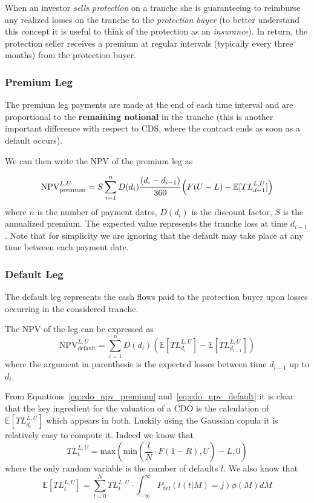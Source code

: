 When an investor \emph{sells protection} on a tranche she is guaranteeing to reimburse any realized losses on the tranche to the \emph{protection buyer} (to better understand this concept it is useful to think of the protection as an \emph{insurance}). 
In return, the protection seller receives a premium at regular intervals (typically every three months) from the protection buyer.

\subsubsection{Premium Leg}
The premium leg payments are made at the end of each time interval and are proportional to the \textbf{remaining notional} in the tranche (this is another important difference with respect to CDS, where the contract ends as soon as a default occurs).

We can then write the NPV of the premium leg as

\begin{equation}
\mathrm{NPV}_{\mathrm{premium}}^{L,U}=S\sum^{n}_{i=1}D(d_i)\cfrac{(d_i - d_{i-1})}{360}\left(F(U-L)-\mathbb{E}[TL_{d-1}^{L,U}]\right)
\label{eq:cdo_npv_premium}
\end{equation}
where $n$ is the number of payment dates, $D(d_i)$ is the discount factor, $S$ is the annualized premium. The expected value represents the tranche loss at time $d_{i-1}$. Note that for simplicity we are ignoring that the default may take place at any time between each payment date.

\subsubsection{Default Leg}
The default leg represents the cash flows paid to the protection buyer upon losses occurring in the considered tranche. 

The NPV of the leg can be expressed as
\begin{equation}
\mathrm{NPV}_{\mathrm{default}}^{L,U}=\sum_{i=1}^{n}D(d_i)\left(\mathbb{E}[TL_{d_i}^{L,U}]-\mathbb{E}[TL_{d_{i-1}}^{L,U}]\right)
\label{eq:cdo_npv_default}
\end{equation}
where the argument in parenthesis is the expected losses between time $d_{i-1}$ up to $d_i$. 

From Equations~\ref{eq:cdo_npv_premium} and~\ref{eq:cdo_npv_default} it is clear that the key ingredient for the valuation of a CDO is the calculation of $\mathbb{E}[TL_{d_i}^{L,U}]$ which appears in both. Luckily using the Gaussian copula it is relatively easy to compute it. Indeed we know that 
\begin{equation}
TL_{t}^{L,U}=\mathrm{max}(\mathrm{min}(\frac{l}{N}\cdot F(1-R), U)-L, 0)
\label{eq:tl}
\end{equation}
where the only random variable is the number of defaults $l$. We also know that 
\begin{equation}
\mathbb{E}[TL_{t}^{L,U}] = \sum_{l=0}^{N}TL_{t}^{L,U}\cdot \int_{-\infty}^{\infty} P_{\mathrm{def}}(l(t|M)=j) \phi(M)dM
\label{eq:etl}
\end{equation}

